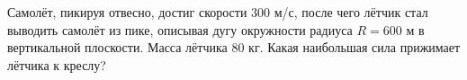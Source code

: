 Самолёт, пикируя отвесно, достиг скорости $300$ м/с,
после чего лётчик стал выводить самолёт из пике,
описывая дугу окружности радиуса $R = 600$ м в вертикальной плоскости.
Масса лётчика $80$ кг.
Какая наибольшая сила прижимает лётчика к креслу?
